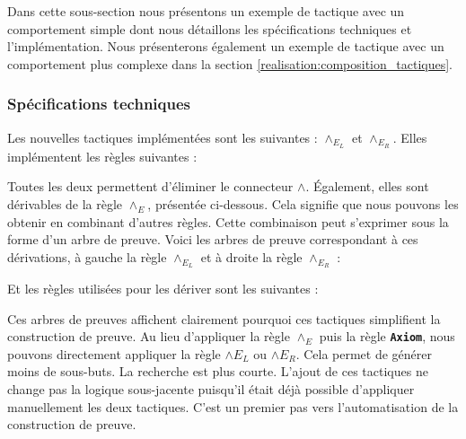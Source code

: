 \documentclass[french,titlepage]{article}
\newcommand{\textttbf}[1]{\texttt{\textbf{#1}}}
\begin{document}
Dans cette sous-section nous présentons un exemple de tactique avec un comportement simple dont nous détaillons les spécifications techniques et l'implémentation. Nous présenterons également un exemple de tactique avec un comportement plus complexe dans la section \ref{realisation:composition_tactiques}.

\subsubsection{Spécifications techniques} \label{realisation:nouvelles_tactiques:specs}
Les nouvelles tactiques implémentées sont les suivantes : $\land_{E_L}$ et $\land_{E_R}$. Elles implémentent les règles suivantes :
Toutes les deux permettent d'éliminer le connecteur $\land$. Également, elles sont dérivables de la règle $\land_E$, présentée ci-dessous. Cela signifie que nous pouvons les obtenir en combinant d'autres règles. Cette combinaison peut s'exprimer sous la forme d'un arbre de preuve. Voici les arbres de preuve correspondant à ces dérivations, à gauche la règle $\land_{E_L}$ et à droite la règle $\land_{E_R}$ :
Et les règles utilisées pour les dériver sont les suivantes :
Ces arbres de preuves affichent clairement pourquoi ces tactiques simplifient la construction de preuve. Au lieu d'appliquer la règle $\land_E$ puis la règle \textttbf{Axiom}, nous pouvons directement appliquer la règle $\land E_L$ ou $\land E_R$. Cela permet de générer moins de sous-buts. La recherche est plus courte. L'ajout de ces tactiques ne change pas la logique sous-jacente puisqu'il était déjà possible d'appliquer manuellement les deux tactiques. C'est un premier pas vers l'automatisation de la construction de preuve.
\end{document}
